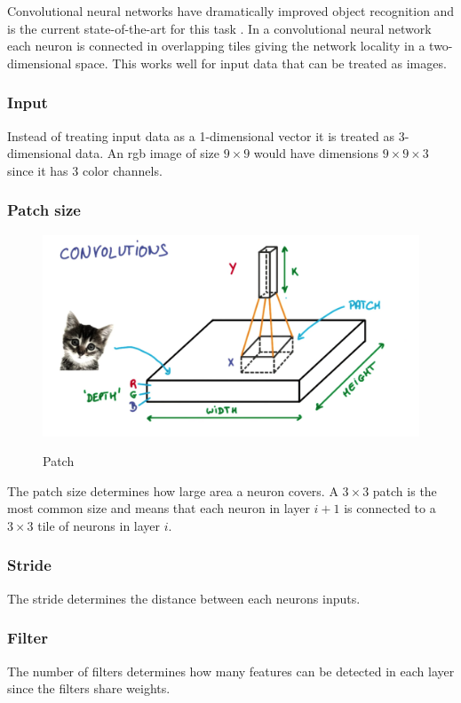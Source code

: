 \documentclass{kththesis}
\begin{document}
Convolutional neural networks have dramatically improved object recognition and is the current state-of-the-art for this task \cite{szegedy2015going}. In a convolutional neural network  each neuron is connected in overlapping tiles giving  the network  locality in a two-dimensional space. This works well for input data that can be treated as images.

\subsubsection{Input}
Instead of treating input data as a 1-dimensional vector it is treated as  3-dimensional data. An  rgb image of size $9\times9$ would have dimensions  $9\times9\times3$ since it has 3 color channels. 

\subsubsection{Patch size}
\begin{figure}
\centering
\includegraphics[width=\textwidth]{images/cnn-patch.png}
\label{fig:cnn-patch}
\caption{Patch}
\end{figure}


The patch size determines how large area a neuron covers. A $3\times3$ patch is the most common size and means that each neuron in layer $i+1$ is connected to a  $3\times3$ tile of neurons in layer $i$.

\subsubsection{Stride}
The stride determines the distance between  each neurons inputs.
\subsubsection{Filter}
The number of filters determines how many features can be detected in each layer since the filters share weights.
\end{document}
